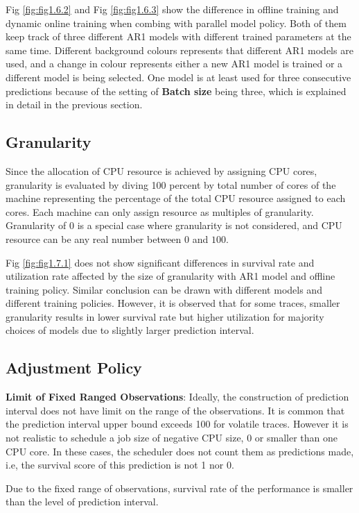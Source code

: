 \documentclass{article}
\begin{document}
\begin{flushleft}
Fig \ref{fig:fig1.6.2} and Fig \ref{fig:fig1.6.3} show the difference in offline
training and dynamic online training when combing with parallel model policy.
Both of them keep track of three different AR1 models with different trained
parameters at the same time. Different background colours represents that
different AR1 models are used, and a change in colour represents either a new
AR1 model is trained or a different model is being selected. One model is at
least used for three consecutive predictions because of the setting of
\textbf{Batch size} being three, which is explained in detail in the previous
section.
\end{flushleft}

\subsection{Granularity}

\begin{flushleft}
Since the allocation of CPU resource is achieved by assigning CPU cores,
granularity is evaluated by diving 100 percent by total number of cores of the
machine representing the percentage of the total CPU resource assigned to each
cores. Each machine can only assign resource as multiples of granularity.
Granularity of $0$ is a special case where granularity is not considered, and
CPU resource can be any real number between $0$ and $100$.

Fig \ref{fig:fig1.7.1} does not show significant differences in survival rate
and utilization rate affected by the size of granularity with AR1 model and
offline training policy. Similar conclusion can be drawn with different models
and different training policies. However, it is observed that for some traces,
smaller granularity results in lower survival rate but higher utilization for
majority choices of models due to slightly larger prediction interval.
\end{flushleft}

\subsection{Adjustment Policy}

\begin{flushleft}
\textbf{Limit of Fixed Ranged Observations}: Ideally, the construction of
prediction interval does not have limit on the range of the observations. It is
common that the prediction interval upper bound exceeds 100 for volatile traces.
However it is not realistic to schedule a job size of negative CPU size, 0 or
smaller than one CPU core. In these cases, the scheduler does not count them as
predictions made, i.e, the survival score of this prediction is not 1 nor 0.

Due to the fixed range of observations, survival rate of the performance is
smaller than the level of prediction interval.
\end{flushleft}
\end{document}
